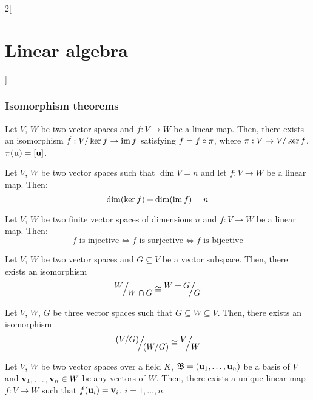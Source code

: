 \documentclass[../../../main.tex]{subfiles}
\begin{document}
\begin{multicols}{2}[\section{Linear algebra}]
  \subsubsection*{Isomorphism theorems}
  \begin{theorem}
    Let $V$, $W$ be two vector spaces and $f:V\rightarrow W$ be a linear map. Then, there exists an isomorphism $\Tilde{f}:\quot{V}{\ker f}\rightarrow \im f$ satisfying $f=\Tilde{f}\circ\pi$, where $\pi:V\rightarrow \quot{V}{\ker f}$, $\pi(\vb{u})=[\vb{u}]$.
    \begin{center}
      \begin{minipage}{\linewidth}
        \centering
        
      \end{minipage}
    \end{center}
  \end{theorem}
  \begin{corollary}
    Let $V$, $W$ be two vector spaces such that $\dim V=n$ and let $f:V\rightarrow W$ be a linear map. Then: $$\dim(\ker f)+\dim(\operatorname{im} f)=n$$
  \end{corollary}
  \begin{corollary}
    Let $V$, $W$ be two finite vector spaces of dimensions $n$ and $f:V\rightarrow W$ be a linear map. Then: $$f\text{ is injective}\iff f\text{ is surjective}\iff f\text{ is bijective}$$
  \end{corollary}
  \begin{theorem}
    Let $V$, $W$ be two vector spaces and $G\subseteq V$ be a vector subspace. Then, there exists an isomorphism $$\quot{W}{W\cap G}\cong\quot{W+G}{G}$$
  \end{theorem}
  \begin{theorem}
    Let $V$, $W$, $G$ be three vector spaces such that $G\subseteq W\subseteq V$. Then, there exists an isomorphism $$\quot{{(\textstyle\quot{V}{G})}}{{(\textstyle\quot{W}{G})}}\cong\quot{V}{W}$$
  \end{theorem}
  \begin{theorem}
    Let $V$, $W$ be two vector spaces over a field $K$, $\mathfrak{B}=(\vb{u}_1,\ldots,\vb{u}_n)$ be a basis of $V$ and $\vb{v}_1,\ldots,\vb{v}_n\in W$ be any vectors of $W$. Then, there exists a unique linear map $f:V\rightarrow W$ such that $f(\vb{u}_i)=\vb{v}_i$, $i=1,\ldots,n$.
  \end{theorem}

\end{multicols}
\end{document}
